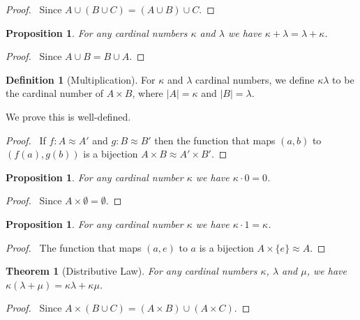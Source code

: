 \documentclass{book}
\let\qed\relax
\newtheorem{prop}[ax]{Proposition}
\newtheorem{thm}[ax]{Theorem}
\theoremstyle{definition}
\newtheorem{df}[ax]{Definition}
\begin{document}
\begin{proof}
\pf\ Since $A \cup (B \cup C) = (A \cup B) \cup C$. \qed
\end{proof}

\begin{prop}
For any cardinal numbers $\kappa$ and $\lambda$ we have $\kappa + \lambda = \lambda + \kappa$.
\end{prop}

\begin{proof}
\pf\ Since $A \cup B = B \cup A$. \qed
\end{proof}

\begin{df}[Multiplication]
For $\kappa$ and $\lambda$ cardinal numbers, we define $\kappa \lambda$ to be the cardinal number of $A \times B$, where $|A| = \kappa$ and $|B| = \lambda$.

We prove this is well-defined.
\end{df}

\begin{proof}
\pf\ If $f : A \approx A'$ and $g : B \approx B'$ then the function that maps $(a,b)$ to $(f(a),g(b))$ is a bijection $A \times B \approx A' \times B'$. \qed
\end{proof}

\begin{prop}
For any cardinal number $\kappa$ we have $\kappa \cdot 0 = 0$.
\end{prop}

\begin{proof}
\pf\ Since $A \times \emptyset = \emptyset$. \qed
\end{proof}

\begin{prop}
For any cardinal number $\kappa$ we have $\kappa \cdot 1 = \kappa$.
\end{prop}

\begin{proof}
\pf\ The function that maps $(a,e)$ to $a$ is a bijection $A \times \{e\} \approx A$. \qed
\end{proof}

\begin{thm}[Distributive Law]
For any cardinal numbers $\kappa$, $\lambda$ and $\mu$, we have $\kappa(\lambda + \mu) = \kappa \lambda + \kappa \mu$.
\end{thm}

\begin{proof}
\pf\ Since $A \times (B \cup C) = (A \times B) \cup (A \times C)$. \qed
\end{proof}
\end{document}
